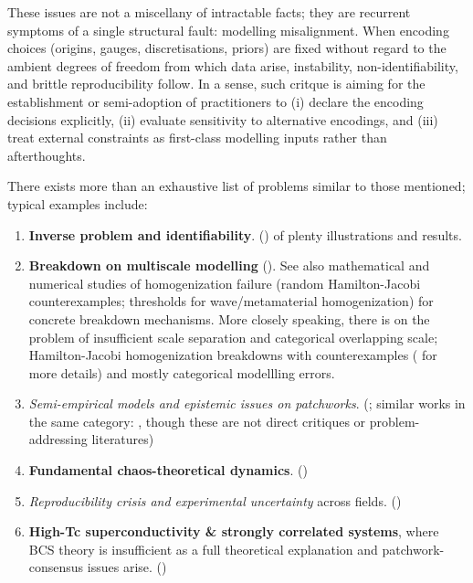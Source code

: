 These issues are not a miscellany of intractable facts; they are recurrent symptoms of a single structural fault: modelling misalignment. When encoding choices (origins, gauges, discretisations, priors) are fixed without regard to the ambient degrees of freedom from which data arise, instability, non-identifiability, and brittle reproducibility follow. In a sense, such critque is aiming for the establishment or semi-adoption of practitioners to (i) declare the encoding decisions explicitly, (ii) evaluate sensitivity to alternative encodings, and (iii) treat external constraints as first-class modelling inputs rather than afterthoughts.

There exists more than an exhaustive list of problems similar to those mentioned; typical examples include:
\begin{enumerate}[leftmargin=0.5cm,topsep=1pt,itemsep=1pt]
\item[(1)] \textbf{Inverse problem and identifiability}. (\cite{Hadamard1902,Tikhonov1977,Vogel2002,ColtonKress1998}) of plenty illustrations and results. 

\item[(2)] \textbf{Breakdown on multiscale modelling} (\cite{E2011,Engquist2003,Kevrekidis2003,Bensoussan1978}). See also mathematical and numerical studies of homogenization failure (random Hamilton-Jacobi counterexamples; thresholds for wave/metamaterial homogenization) for concrete breakdown mechanisms. More closely speaking, there is \cite{Ameen2018} on the problem of insufficient scale separation and categorical overlapping scale; Hamilton-Jacobi homogenization breakdowns with counterexamples (\cite{Weinanetal2008} for more details) and mostly categorical modellling errors.

\item[(3)] \textit{Semi-empirical models and epistemic issues on patchworks}. (\cite{Randall2003,Sornette2003}; similar works in the same category: \cite{Pope2000,Cornell1995}, though these are not direct critiques or problem-addressing literatures)

\item[(4)] \textbf{Fundamental chaos-theoretical dynamics}. (\cite{Lorenz1963,Strogatz2018,RuelleTakens1971,Ott1990})

\item[(5)] \textit{Reproducibility crisis and experimental uncertainty} across fields. (\cite{Ioannidis2005,OpenScience2015,BegleyEllis2012})

\item[(6)] \textbf{High-Tc superconductivity \& strongly correlated systems}, where BCS theory is insufficient as a full theoretical explanation and patchwork-consensus issues arise. (\cite{BednorzMuller1986,Anderson1987,Lee2006,Scalapino1995})


\end{enumerate}
